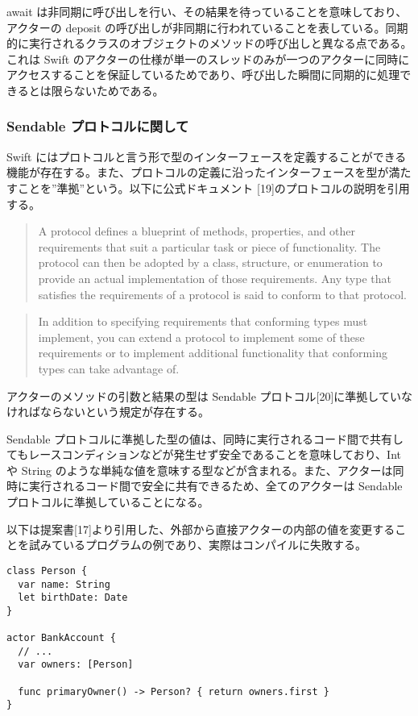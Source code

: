 await
は非同期に呼び出しを行い、その結果を待っていることを意味しており、アクターの
deposit
の呼び出しが非同期に行われていることを表している。同期的に実行されるクラスのオブジェクトのメソッドの呼び出しと異なる点である。
これは Swift
のアクターの仕様が単一のスレッドのみが一つのアクターに同時にアクセスすることを保証しているためであり、呼び出した瞬間に同期的に処理できるとは限らないためである。

\subsubsection{Sendable プロトコルに関して}

Swift
にはプロトコルと言う形で型のインターフェースを定義することができる機能が存在する。また、プロトコルの定義に沿ったインターフェースを型が満たすことを''準拠''という。以下に公式ドキュメント
{[}19{]}のプロトコルの説明を引用する。

\begin{quote}
A protocol defines a blueprint of methods, properties, and other
requirements that suit a particular task or piece of functionality. The
protocol can then be adopted by a class, structure, or enumeration to
provide an actual implementation of those requirements. Any type that
satisfies the requirements of a protocol is said to conform to that
protocol.
\end{quote}

\begin{quote}
In addition to specifying requirements that conforming types must
implement, you can extend a protocol to implement some of these
requirements or to implement additional functionality that conforming
types can take advantage of.
\end{quote}

アクターのメソッドの引数と結果の型は Sendable
プロトコル{[}20{]}に準拠していなければならないという規定が存在する。

Sendable
プロトコルに準拠した型の値は、同時に実行されるコード間で共有してもレースコンディションなどが発生せず安全であることを意味しており、Int
や String
のような単純な値を意味する型などが含まれる。また、アクターは同時に実行されるコード間で安全に共有できるため、全てのアクターは
Sendable プロトコルに準拠していることになる。

以下は提案書{[}17{]}より引用した、外部から直接アクターの内部の値を変更することを試みているプログラムの例であり、実際はコンパイルに失敗する。

\begin{verbatim}
class Person {
  var name: String
  let birthDate: Date
}

actor BankAccount {
  // ...
  var owners: [Person]

  func primaryOwner() -> Person? { return owners.first }
}
\end{verbatim}

